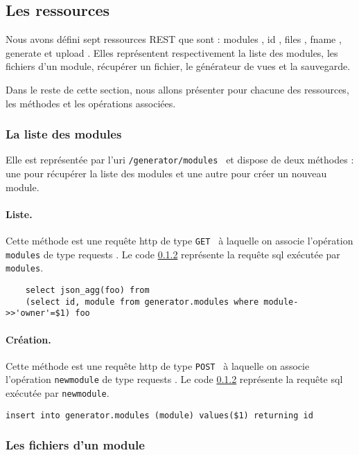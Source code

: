 \documentclass[a4paper,11pt]{report}
\begin{document}
\subsection{Les ressources}
Nous avons défini sept ressources REST   que sont : \og modules \fg ,  \og id \fg , \og files \fg , \og fname \fg ,
 \og generate \fg et \og upload \fg . Elles représentent respectivement la liste des modules,
 les fichiers  d'un module, récupérer un fichier,  le générateur de vues et la sauvegarde.
 
  Dans le reste de cette section,  nous allons présenter pour chacune des ressources,  les méthodes et les opérations associées.
 
 \subsubsection{La liste des modules}

Elle est représentée par l'uri {\tt  /generator/modules } et dispose de deux méthodes : une pour récupérer la liste des modules et
une autre pour créer un nouveau module.

\paragraph{Liste.} Cette méthode est une requête http de type {\tt GET } à laquelle on associe l'opération {\tt modules} de type  \og requests \fg  .
Le code \ref{} représente la requête sql  exécutée par  {\tt modules}.

\begin{verbatim}
	select json_agg(foo) from 
	(select id, module from generator.modules where module->>'owner'=$1) foo
\end{verbatim}

\paragraph{Création.} Cette méthode est une requête http de type {\tt POST } à laquelle on associe l'opération {\tt newmodule} de type  \og requests \fg  .
Le code \ref{} représente la requête sql  exécutée par  {\tt newmodule}.

\begin{verbatim}
insert into generator.modules (module) values($1) returning id
\end{verbatim}

\subsubsection{ Les fichiers  d'un module}
\end{document}
